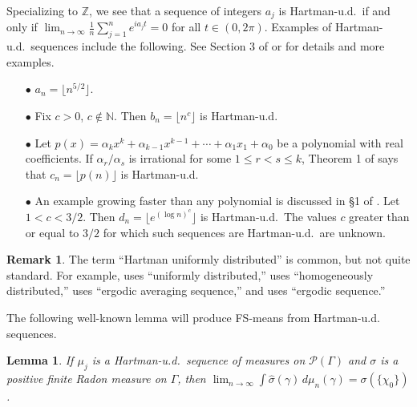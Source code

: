 \documentclass[12pt]{amsart} \usepackage{amsmath,centernot,amssymb,leftindex}
\newtheorem{lemma}[theorem]{Lemma}
\numberwithin{theorem}{section}
\numberwithin{equation}{section}
\theoremstyle{definition}
\newtheorem{remark}[theorem]{Remark}
\begin{document}
Specializing to $\mathbb Z$, we see that a sequence of integers $a_{j}$ is Hartman-u.d.~if and only if $\lim_{n\to\infty} \frac{1}{n}\sum_{j=1}^{n} e^{i a_{j}t}=0$ for all $t\in (0,2\pi)$.  Examples of Hartman-u.d.~sequences include the following. See Section 3 of \cite{BKQW} or \cite{Nair_PoincareI} for details and more examples.
\begin{enumerate}
	\item[$\bullet$] $a_{n}=\lfloor n^{5/2}\rfloor$.
	
	\item[$\bullet$] Fix $c>0$, $c\notin \mathbb N$.  Then $b_{n}=\lfloor n^{c}\rfloor$ is Hartman-u.d.
	
	\item[$\bullet$] Let $p(x)=\alpha_{k}x^{k}+\alpha_{k-1}x^{k-1}+\cdots + \alpha_{1}x_{1}+\alpha_{0}$ be a polynomial with real coefficients. If $\alpha_{r}/\alpha_{s}$ is irrational for some $1\leq r<s\leq k$, Theorem 1 of \cite{Veech_Well} says that $c_{n}=\lfloor p(n)\rfloor$ is Hartman-u.d.
	
	\item[$\bullet$] An example growing faster than any polynomial is discussed in \S1 of \cite{Boshernitzan_Homogeneous}. Let $1<c<3/2$.  Then $d_{n}=\lfloor e^{(\log n)^{c}}\rfloor$ is Hartman-u.d.~The values $c$ greater than or equal to $3/2$ for which such sequences are Hartman-u.d.~are unknown.
\end{enumerate}



\begin{remark}
	The term ``Hartman uniformly distributed'' is common, but not quite standard.  For example, \cite{Veech_Well} uses ``uniformly distributed,'' \cite{Boshernitzan_Homogeneous} uses ``homogeneously distributed,'' \cite{Griesmer_SumsetsDenseSparse} uses ``ergodic averaging sequence,'' and \cite{BergelsonFerreMoragues_ErgodicCorrespondence} uses ``ergodic sequence.''
\end{remark}


The following well-known lemma will produce FS-means from Hartman-u.d. sequences.  

\begin{lemma}\label{lem:HartmanUDisFS}
	If $\mu_{j}$ is a Hartman-u.d.~sequence of measures on $\mathcal P(\Gamma)$ and $\sigma$ is a positive finite Radon measure on $\widehat{\Gamma}$, then $\lim_{n\to\infty}\int \hat{\sigma}(\gamma)\, d\mu_{n}(\gamma)=\sigma(\{\chi_{0}\})$.
\end{lemma}
\end{document}
